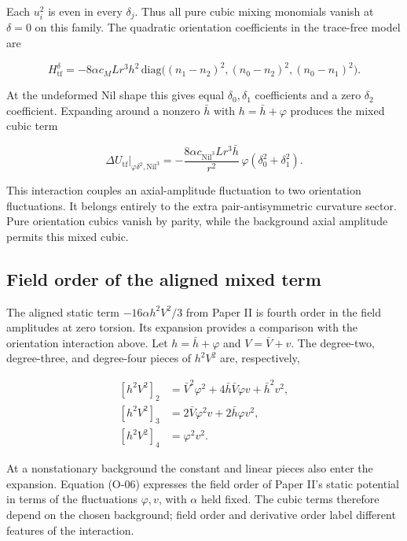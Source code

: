 Each $u_i^2$ is even in every $\delta_j$. Thus all pure cubic mixing monomials vanish at $\delta=0$ on this family. The quadratic orientation coefficients in the trace-free model are

\begin{equation}\tag{O-04}\label{eq:O-04}
H^{\delta}_{\mathrm{tf}}
=-8\alpha c_M Lr^3 h^2\,
\mathrm{diag}\big((n_1-n_2)^2,(n_0-n_2)^2,(n_0-n_1)^2\big).
\end{equation}

At the undeformed Nil shape this gives equal $\delta_0,\delta_1$ coefficients and a zero $\delta_2$ coefficient. Expanding around a nonzero $\bar h$ with $h=\bar h+\varphi$ produces the mixed cubic term

\begin{equation}\tag{O-05}\label{eq:O-05}
\left.\Delta U_{\mathrm{tf}}\right|_{\varphi\delta^2,\mathrm{Nil}^3}
=-\frac{8\alpha c_{\mathrm{Nil}^3}Lr^3\bar h}{r^2}
\,\varphi(\delta_0^2+\delta_1^2).
\end{equation}

This interaction couples an axial-amplitude fluctuation to two orientation fluctuations. It belongs entirely to the extra pair-antisymmetric curvature sector. Pure orientation cubics vanish by parity, while the background axial amplitude permits this mixed cubic.

\subsection{Field order of the aligned mixed term}

The aligned static term $-16\alpha h^2V^2/3$ from Paper II is fourth order in the field amplitudes at zero torsion. Its expansion provides a comparison with the orientation interaction above. Let $h=\bar h+\varphi$ and $V=\bar V+v$. The degree-two, degree-three, and degree-four pieces of $h^2V^2$ are, respectively,

\begin{equation}\tag{O-06}\label{eq:O-06}
\begin{aligned}
[h^2V^2]_2&=\bar V^2\varphi^2+4\bar h\bar V\varphi v+\bar h^2v^2,\\
[h^2V^2]_3&=2\bar V\varphi^2v+2\bar h\varphi v^2,\\
[h^2V^2]_4&=\varphi^2v^2.
\end{aligned}
\end{equation}

At a nonstationary background the constant and linear pieces also enter the expansion. Equation (O-06) expresses the field order of Paper II's static potential in terms of the fluctuations $\varphi,v$, with $\alpha$ held fixed. The cubic terms therefore depend on the chosen background; field order and derivative order label different features of the interaction.

